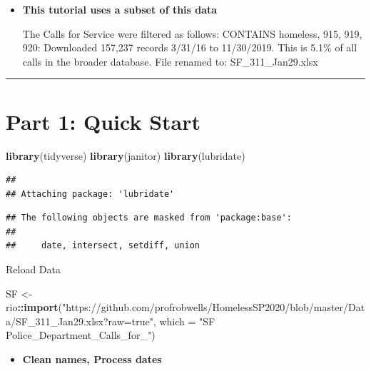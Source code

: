 \documentclass[]{book}
\newenvironment{Shaded}{\begin{snugshade}}{\end{snugshade}}
\newcommand{\DataTypeTok}[1]{\textcolor[rgb]{0.13,0.29,0.53}{#1}}
\newcommand{\KeywordTok}[1]{\textcolor[rgb]{0.13,0.29,0.53}{\textbf{#1}}}
\newcommand{\NormalTok}[1]{#1}
\newcommand{\OperatorTok}[1]{\textcolor[rgb]{0.81,0.36,0.00}{\textbf{#1}}}
\newcommand{\StringTok}[1]{\textcolor[rgb]{0.31,0.60,0.02}{#1}}
\providecommand{\tightlist}{%
  \setlength{\itemsep}{0pt}\setlength{\parskip}{0pt}}
\begin{document}
\begin{itemize}
\item
  \textbf{This tutorial uses a subset of this data}

  The Calls for Service were filtered as follows:
  CONTAINS homeless, 915, 919, 920: Downloaded 157,237 records 3/31/16 to 11/30/2019.
  This is 5.1\% of all calls in the broader database.
  File renamed to: SF\_311\_Jan29.xlsx
\end{itemize}

\begin{center}\rule{0.5\linewidth}{0.5pt}\end{center}

\hypertarget{part-1-quick-start}{%
\chapter{Part 1: Quick Start}\label{part-1-quick-start}}

\begin{Shaded}
\begin{Highlighting}[]
\KeywordTok{library}\NormalTok{(tidyverse)}
\KeywordTok{library}\NormalTok{(janitor)}
\KeywordTok{library}\NormalTok{(lubridate)}
\end{Highlighting}
\end{Shaded}

\begin{verbatim}
## 
## Attaching package: 'lubridate'
\end{verbatim}

\begin{verbatim}
## The following objects are masked from 'package:base':
## 
##     date, intersect, setdiff, union
\end{verbatim}

Reload Data

\begin{Shaded}
\begin{Highlighting}[]
\NormalTok{SF <-}\StringTok{ }\NormalTok{rio}\OperatorTok{::}\KeywordTok{import}\NormalTok{(}\StringTok{"https://github.com/profrobwells/HomelessSP2020/blob/master/Data/SF_311_Jan29.xlsx?raw=true"}\NormalTok{, }\DataTypeTok{which =} \StringTok{"SF Police_Department_Calls_for_"}\NormalTok{) }
\end{Highlighting}
\end{Shaded}

\begin{itemize}
\tightlist
\item
  \textbf{Clean names, Process dates}
\end{itemize}
\end{document}
